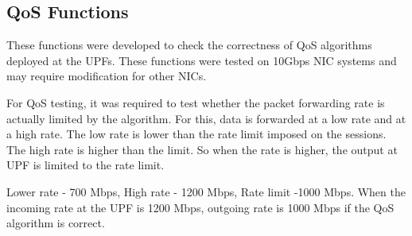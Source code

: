 \documentclass{article}
\begin{document}
\subsection{QoS Functions}
These functions were developed to check the correctness of QoS algorithms deployed at the UPFs. These functions were tested on 10Gbps NIC systems and may require modification for other NICs.


For QoS testing, it was required to test whether the packet forwarding rate is actually limited by
 the algorithm. For this, data is forwarded at a low rate and at a high rate. The low rate is lower than  the rate limit imposed on the sessions. The high rate is higher than the limit. So when the rate is higher, the output at UPF is limited to the rate limit. 
 
 Lower rate - 700 Mbps, High rate - 1200 Mbps, Rate limit -1000 Mbps. When the incoming rate at the UPF is 1200 Mbps, outgoing rate is 1000 Mbps if the QoS algorithm is correct.
\end{document}
